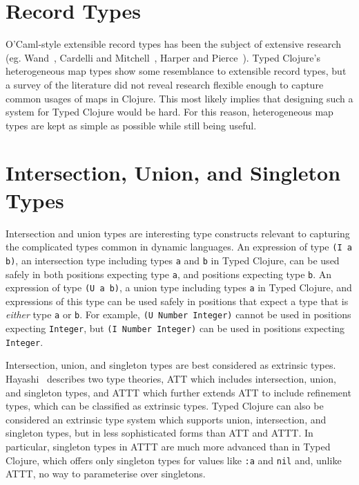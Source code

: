 \section{Record Types}
\label{sec:recordtypes}

O'Caml-style extensible record types has been the subject of extensive research 
(eg. Wand~\cite{Wan89}, Cardelli and Mitchell~\cite{CM91}, Harper and Pierce~\cite{HP91}).
Typed Clojure's heterogeneous map types show some resemblance to extensible
record types, but a survey of the literature did not reveal research flexible
enough to capture common usages of maps in Clojure.
This most likely implies that designing such a system for Typed Clojure would be hard.
For this reason, heterogeneous map types are kept as simple as possible while still being useful.

\section{Intersection, Union, and Singleton Types}
\label{sec:intersectionunion}

Intersection and union types are interesting type constructs relevant to capturing the complicated
types common in dynamic languages.
An expression of type \lstinline|(I a b)|, an intersection type including types \lstinline|a|
and \lstinline|b| in Typed Clojure, can be used safely in both positions expecting type \lstinline|a|,
and positions expecting type \lstinline|b|.
An expression of type \lstinline|(U a b)|, a union type including types \lstinline|a| in Typed Clojure,
and expressions of this type can be used safely in positions 
that expect a type that is \emph{either} type \lstinline|a|
or \lstinline|b|.
For example, \lstinline|(U Number Integer)| cannot be used in positions expecting \lstinline|Integer|,
but \lstinline|(I Number Integer)| can be used in positions expecting \lstinline|Integer|.

Intersection, union, and singleton types are best considered as extrinsic types.
Hayashi~\cite{Hay91} describes two type theories, ATT which includes
intersection, union, and singleton types, and ATTT which further extends ATT
to include refinement types, which can be classified as extrinsic types.
Typed Clojure can also be considered an extrinsic type system which supports
union, intersection, and singleton types, but in less sophisticated forms
than ATT and ATTT.
In particular, singleton types in ATTT are much more advanced than in Typed Clojure,
which offers only singleton types for values like \lstinline|:a| and \lstinline|nil|
and, unlike ATTT, no way to parameterise over singletons.

